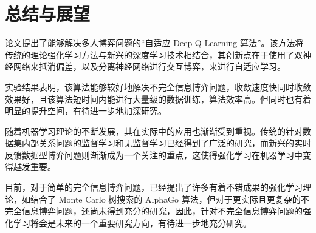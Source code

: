 
\chapter{总结与展望}

论文提出了能够解决多人博弈问题的“自适应 Deep Q-Learning 算法”。该方法将传统的理论强化学习方法与新兴的深度学习技术相结合，其创新点在于使用了双神经网络来抵消偏差，以及分离神经网络进行交互博弈，来进行自适应学习。

实验结果表明，该算法能够较好地解决不完全信息博弈问题，收敛速度快同时收敛效果好，且该算法短时间内能进行大量级的数据训练，算法效率高。但同时也有着明显的提升空间，有待进一步地加深研究。

随着机器学习理论的不断发展，其在实际中的应用也渐渐受到重视。传统的针对数据集内部关系问题的监督学习和无监督学习已经得到了广泛的研究，而新兴的实时反馈数据型博弈问题则渐渐成为一个关注的重点，这使得强化学习在机器学习中变得越发重要。

目前，对于简单的完全信息博弈问题，已经提出了许多有着不错成果的强化学习理论，如结合了 Monte Carlo 树搜索的 AlphaGo 算法\cite{silver2017mastering}，但对于更实际且更复杂的不完全信息博弈问题，还尚未得到充分的研究，因此，针对不完全信息博弈问题的强化学习将会是未来的一个重要研究方向，有待进一步地充分研究。